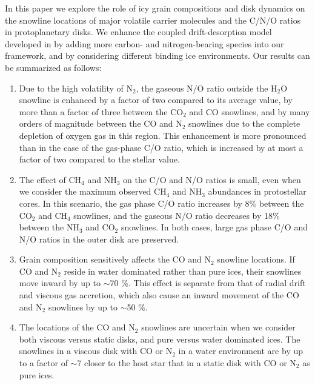 \documentclass[apj]{emulateapj}
\begin{document}
In this paper we explore the role of icy grain compositions and disk dynamics on the snowline locations of major volatile carrier molecules and the C/N/O ratios in protoplanetary disks. We enhance the coupled drift-desorption model developed in \citet{piso15b} by adding more carbon- and nitrogen-bearing species into our framework, and by considering different binding ice environments. Our results can be summarized as follows:

\begin{enumerate}

\item Due to the high volatility of N$_2$, the gaseous N/O ratio outside the H$_2$O snowline is enhanced by a factor of two compared to its average value, by more than a factor of three between the CO$_2$ and CO snowlines, and by many orders of magnitude between the CO and N$_2$ snowlines due to the complete depletion of oxygen gas in this region. This enhancement is more pronounced than in the case of the gas-phase C/O ratio, which is increased by at most a factor of two compared to the stellar value. %

\item The effect of CH$_4$ and NH$_3$ on the C/O and N/O ratios is small, even when we consider the maximum observed CH$_4$ and NH$_3$ abundances in protostellar cores. In this scenario, the gas phase C/O ratio increases by 8\% between the CO$_2$ and CH$_4$ snowlines, and  the gaseous N/O ratio decreases by 18\% between the NH$_3$ and CO$_2$ snowlines. In both cases, large gas phase C/O and N/O ratios in the outer disk are preserved.

\item Grain composition sensitively affects the CO and N$_2$ snowline locations. If CO and N$_2$ reside in water dominated rather than pure ices, their snowlines move inward by up to $\sim$70 \%. This effect is separate from that of radial drift and viscous gas accretion, which also cause an inward movement of the CO and N$_2$ snowlines by up to $\sim$50 \%. 

\item The locations of the CO and N$_2$ snowlines are uncertain when we consider both viscous versus static disks, and pure versus water dominated ices. The snowlines in a viscous disk with CO or N$_2$ in a water environment are by up to a factor of $\sim$7 closer to the host star that in a static disk with CO or N$_2$ as pure ices. 

\end{enumerate}
\end{document}
